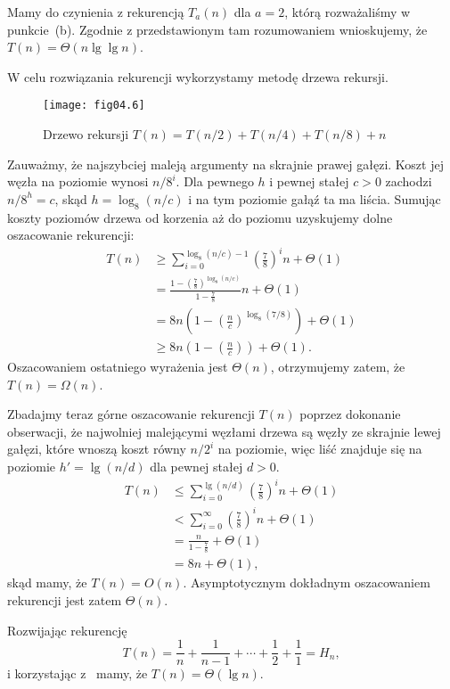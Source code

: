 \subexercise{} %
Mamy do czynienia z rekurencją $T_a(n)$ dla $a=2$, którą rozważaliśmy w punkcie~(b). Zgodnie z przedstawionym tam rozumowaniem wnioskujemy, że $T(n)=\Theta(n\lg\lg n)$.

\subexercise{} %
W celu rozwiązania rekurencji wykorzystamy metodę drzewa rekursji.
\begin{figure}[ht]
	\begin{center}
		\texttt{[image: fig04.6]}
	\end{center}
	\caption{Drzewo rekursji $T(n)=T(n/2)+T(n/4)+T(n/8)+n$} \label{fig:4-4f}
\end{figure}
Zauważmy, że najszybciej maleją argumenty na skrajnie prawej gałęzi. Koszt jej węzła na  poziomie wynosi $n/8^i$. Dla pewnego $h$ i pewnej stałej $c>0$ zachodzi $n/8^h=c$, skąd $h=\log_8(n/c)$ i na tym poziomie gałąź ta ma liścia. Sumując koszty poziomów drzewa od korzenia aż do  poziomu uzyskujemy dolne oszacowanie rekurencji:
\begin{align*}
	T(n) &\ge \sum_{i=0}^{\log_8(n/c)-1}\left(\frac{7}{8}\right)^in+\Theta(1) \\
	&= \frac{1-\left(\frac{7}{8}\right)^{\log_8(n/c)}}{1-\frac{7}{8}}n+\Theta(1) \\
	&= 8n\left(1-\left(\frac{n}{c}\right)^{\log_8(7/8)}\right)+\Theta(1) \\
	&\ge 8n\left(1-\left(\frac{n}{c}\right)\right)+\Theta(1).
\end{align*}
Oszacowaniem ostatniego wyrażenia jest $\Theta(n)$, otrzymujemy zatem, że $T(n)=\Omega(n)$.

Zbadajmy teraz górne oszacowanie rekurencji $T(n)$ poprzez dokonanie obserwacji, że najwolniej malejącymi węzłami drzewa są węzły ze skrajnie lewej gałęzi, które wnoszą koszt równy $n/2^i$ na  poziomie, więc liść znajduje się na poziomie $h'=\lg(n/d)$ dla pewnej stałej $d>0$.
\begin{align*}
	T(n) &\le \sum_{i=0}^{\lg(n/d)}\left(\frac{7}{8}\right)^in+\Theta(1) \\
	&< \sum_{i=0}^\infty\left(\frac{7}{8}\right)^in+\Theta(1) \\
	&= \frac{n}{1-\frac{7}{8}}+\Theta(1) \\
	&= 8n+\Theta(1),
\end{align*}
skąd mamy, że $T(n)=O(n)$. Asymptotycznym dokładnym oszacowaniem rekurencji jest zatem $\Theta(n)$.

\subexercise{} %
Rozwijając rekurencję
\[
	T(n) = \frac{1}{n}+\frac{1}{n-1}+\cdots+\frac{1}{2}+\frac{1}{1} = H_n,
\]
i korzystając z~ mamy, że $T(n)=\Theta(\lg n)$.

